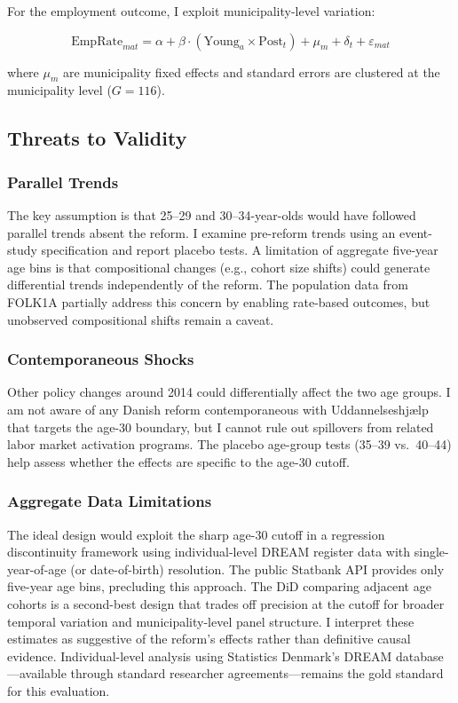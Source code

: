 \documentclass[12pt]{article}
\begin{document}
For the employment outcome, I exploit municipality-level variation:

\begin{equation}
\text{EmpRate}_{mat} = \alpha + \beta \cdot (\text{Young}_a \times \text{Post}_t) + \mu_m + \delta_t + \varepsilon_{mat}
\label{eq:did_emp}
\end{equation}

\noindent where $\mu_m$ are municipality fixed effects and standard errors are clustered at the municipality level ($G = 116$).

\subsection{Threats to Validity}

\subsubsection*{Parallel Trends} The key assumption is that 25--29 and 30--34-year-olds would have followed parallel trends absent the reform. I examine pre-reform trends using an event-study specification and report placebo tests. A limitation of aggregate five-year age bins is that compositional changes (e.g., cohort size shifts) could generate differential trends independently of the reform. The population data from FOLK1A partially address this concern by enabling rate-based outcomes, but unobserved compositional shifts remain a caveat.

\subsubsection*{Contemporaneous Shocks} Other policy changes around 2014 could differentially affect the two age groups. I am not aware of any Danish reform contemporaneous with Uddannelseshjælp that targets the age-30 boundary, but I cannot rule out spillovers from related labor market activation programs. The placebo age-group tests (35--39 vs.\ 40--44) help assess whether the effects are specific to the age-30 cutoff.

\subsubsection*{Aggregate Data Limitations} The ideal design would exploit the sharp age-30 cutoff in a regression discontinuity framework using individual-level DREAM register data with single-year-of-age (or date-of-birth) resolution. The public Statbank API provides only five-year age bins, precluding this approach. The DiD comparing adjacent age cohorts is a second-best design that trades off precision at the cutoff for broader temporal variation and municipality-level panel structure. I interpret these estimates as suggestive of the reform's effects rather than definitive causal evidence. Individual-level analysis using Statistics Denmark's DREAM database---available through standard researcher agreements---remains the gold standard for this evaluation.
\end{document}

